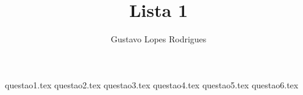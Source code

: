 \documentclass[10pt,a4paper]{article}
\author{Gustavo Lopes Rodrigues}
\title{Lista 1}
\begin{document}
	\maketitle
	
	{questao1.tex}
	{questao2.tex}
	{questao3.tex}
	{questao4.tex}
	{questao5.tex}
	{questao6.tex}
\end{document}
